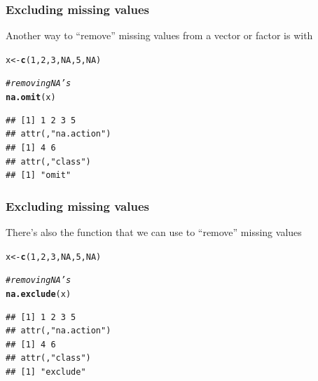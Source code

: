 \documentclass[12pt]{beamer}\usepackage[]{graphicx}\usepackage[]{color}
\makeatletter
\newcommand{\hlnum}[1]{\textcolor[rgb]{0.686,0.059,0.569}{#1}}%
\newcommand{\hlcom}[1]{\textcolor[rgb]{0.678,0.584,0.686}{\textit{#1}}}%
\newcommand{\hlstd}[1]{\textcolor[rgb]{0.345,0.345,0.345}{#1}}%
\newcommand{\hlkwb}[1]{\textcolor[rgb]{0.69,0.353,0.396}{#1}}%
\newcommand{\hlkwd}[1]{\textcolor[rgb]{0.737,0.353,0.396}{\textbf{#1}}}%
\newenvironment{kframe}{%
 \def\at@end@of@kframe{}%
 \ifinner\ifhmode%
  \def\at@end@of@kframe{\end{minipage}}%
  \begin{minipage}{\columnwidth}%
 \fi\fi%
 \def\FrameCommand##1{\hskip\@totalleftmargin \hskip-\fboxsep
 \colorbox{shadecolor}{##1}\hskip-\fboxsep
     \hskip-\linewidth \hskip-\@totalleftmargin \hskip\columnwidth}%
 \MakeFramed {\advance\hsize-\width
   \@totalleftmargin\z@ \linewidth\hsize
   \@setminipage}}%
 {\par\unskip\endMakeFramed%
 \at@end@of@kframe}
\newenvironment{knitrout}{}{} %
\makeatother
\begin{document}
\begin{frame}[fragile]
\frametitle{Excluding missing values}

Another way to ``remove'' missing values from a vector or factor is with {\hilit {}}
\begin{knitrout}\footnotesize
{}\color{fgcolor}\begin{kframe}
\begin{alltt}
\hlstd{x} \hlkwb{<-} \hlkwd{c}\hlstd{(}\hlnum{1}\hlstd{,} \hlnum{2}\hlstd{,} \hlnum{3}\hlstd{,} \hlnum{NA}\hlstd{,} \hlnum{5}\hlstd{,} \hlnum{NA}\hlstd{)}

\hlcom{# removing NA's}
\hlkwd{na.omit}\hlstd{(x)}
\end{alltt}
\begin{verbatim}
## [1] 1 2 3 5
## attr(,"na.action")
## [1] 4 6
## attr(,"class")
## [1] "omit"
\end{verbatim}
\end{kframe}
\end{knitrout}

\end{frame}


\begin{frame}[fragile]
\frametitle{Excluding missing values}

There's also the {\hilit {}} function that we can use to ``remove'' missing values
\begin{knitrout}\footnotesize
{}\color{fgcolor}\begin{kframe}
\begin{alltt}
\hlstd{x} \hlkwb{<-} \hlkwd{c}\hlstd{(}\hlnum{1}\hlstd{,} \hlnum{2}\hlstd{,} \hlnum{3}\hlstd{,} \hlnum{NA}\hlstd{,} \hlnum{5}\hlstd{,} \hlnum{NA}\hlstd{)}

\hlcom{# removing NA's}
\hlkwd{na.exclude}\hlstd{(x)}
\end{alltt}
\begin{verbatim}
## [1] 1 2 3 5
## attr(,"na.action")
## [1] 4 6
## attr(,"class")
## [1] "exclude"
\end{verbatim}
\end{kframe}
\end{knitrout}

\end{frame}

\end{document}
